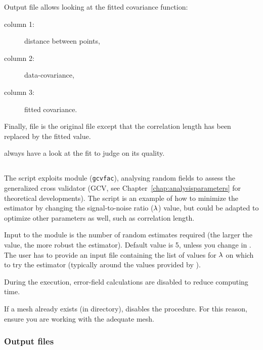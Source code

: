 Output file  allows looking at the fitted covariance function:
\begin{description}
\item[column 1:] distance between points, 
\item[column 2:] data-covariance, 
\item[column 3:] fitted covariance.
\end{description} 

Finally, file  is the original  file except that the correlation length has been replaced by the fitted value. 

\info always have a look at the fit to judge on its quality. %

\subsection{}

The script  exploits \diva module (\texttt{gcvfac}), analysing random fields to assess the generalized cross validator (GCV, see Chapter~\ref{chap:analysisparameters} for theoretical developments). The script  is an example of how to minimize the estimator by changing the signal-to-noise ratio ($\lambda$) value, but could be adapted to optimize other parameters as well, such as correlation length.

Input to the module is the number of random estimates required (the larger the value, the more robust the estimator). Default value is 5, unless you change in . The user has to provide an input file  containing the list of values for $\lambda$ on which to try the estimator (typically around the values provided by ).

During the  execution, error-field calculations are disabled to reduce computing time. 

\btips
If a mesh already exists (in  directory),  disables the  procedure. For this reason, ensure you are working with the adequate mesh.
\etips

\subsubsection{Output files}

